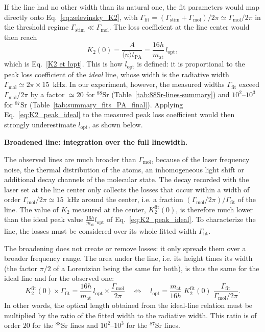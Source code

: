 If the line had no other width than its natural one, the fit parameters would map
directly onto Eq.~\ref{eq:zelevinsky_K2}, with
$\Gamma_{\text{fit}} = (\Gamma_{\text{stim}} + \Gamma_{\text{mol}})/2\pi \simeq \Gamma_{\text{mol}}/2\pi$
in the threshold regime $\Gamma_{\text{stim}} \ll \Gamma_{\text{mol}}$. The loss
coefficient at the line center would then reach
\begin{equation}
    K_2(0) = \frac{A}{\langle n\rangle t_{\text{PA}}} = \frac{16h}{m_{\text{at}}}\,l_{\text{opt}},
    \label{eq:K2_peak_ideal}
\end{equation}
which is Eq.~\ref{K2 et lopt}. This is how $l_{\text{opt}}$ is defined: it is
proportional to the peak loss coefficient of the \textit{ideal} line, whose width is
the radiative width $\Gamma_{\text{mol}} \simeq 2\pi\times15$~kHz. In our
experiment, however, the measured widths $\Gamma_{\text{fit}}$ exceed
$\Gamma_{\text{mol}}/2\pi$ by a factor $\simeq20$ for $^{88}\text{Sr}$
(Table~\ref{tab:88Sr-lines-summary}) and $10^2$--$10^3$ for $^{87}\text{Sr}$
(Table~\ref{tab:summary_fits_PA_final}). Applying Eq.~\ref{eq:K2_peak_ideal} to the
measured peak loss coefficient would then strongly underestimate $l_{\text{opt}}$,
as shown below.

\textbf{Broadened line: integration over the full linewidth.}

The observed lines are much broader than $\Gamma_{\text{mol}}$, because of the laser
frequency noise, the thermal distribution of the atoms, an inhomogeneous light shift
or additional decay channels of the molecular state. The
decay recorded with the laser set at the line center only collects the losses that
occur within a width of order $\Gamma_{\text{mol}}/2\pi\simeq15$~kHz around the
center, i.e. a fraction $(\Gamma_{\text{mol}}/2\pi)/\Gamma_{\text{fit}}$ of the line.
The value of $K_2$ measured at the center, $K_2^{\text{fit}}(0)$, is therefore much
lower than the ideal peak value $\frac{16h}{m_{\text{at}}}l_{\text{opt}}$ of
Eq.~\ref{eq:K2_peak_ideal}. To characterize the line, the losses must be considered
over its whole fitted width $\Gamma_{\text{fit}}$.

The broadening does not create or remove losses: it only spreads them over a broader
frequency range. The area under the line, i.e. its height times its width (the factor
$\pi/2$ of a Lorentzian being the same for both), is thus the same for the ideal line
and for the observed one:
\begin{equation}
    K_2^{\text{fit}}(0)\times\Gamma_{\text{fit}}
    = \frac{16h}{m_{\text{at}}}\,l_{\text{opt}}\times\frac{\Gamma_{\text{mol}}}{2\pi}
    \quad\Longleftrightarrow\quad
    l_{\text{opt}} = \frac{m_{\text{at}}}{16h}\;K_2^{\text{fit}}(0)\;
    \frac{\Gamma_{\text{fit}}}{\Gamma_{\text{mol}}/2\pi}.
    \label{eq:lopt_corrected}
\end{equation}
In other words, the optical length obtained from the ideal-line relation must be
multiplied by the ratio of the fitted width to the radiative width. This ratio is of
order $20$ for the $^{88}\text{Sr}$ lines and $10^2$--$10^3$ for the
$^{87}\text{Sr}$ lines.

